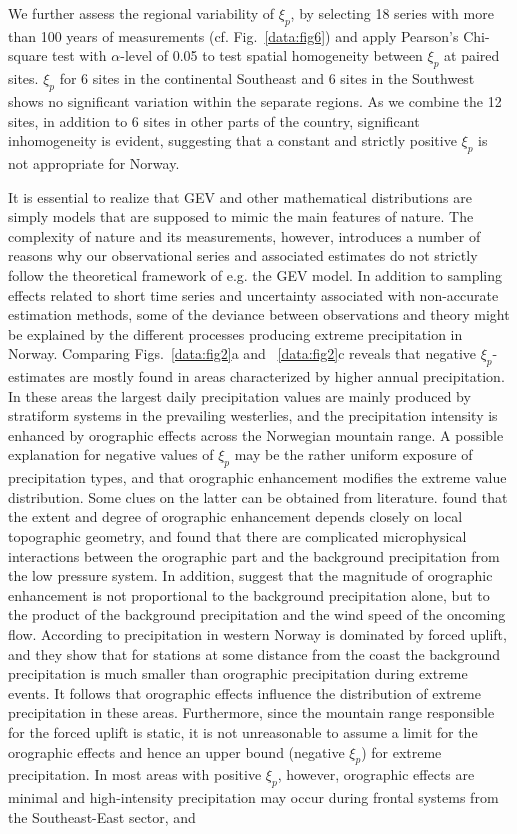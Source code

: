 \documentclass[12pt,a4paper,english]{article}
\begin{document}
We further assess the regional variability of $\xi_{p}$, by selecting 18 series with more than 100 years of measurements (cf. Fig.~\ref{data:fig6}) and apply Pearson's Chi-square test \citep{Pearson1900} with $\alpha$-level of 0.05 to test spatial homogeneity between $\xi_{p}$ at paired sites. $\xi_{p}$ for 6 sites in the continental Southeast and 6 sites in the Southwest shows no significant variation within the separate regions. As we combine the 12 sites, in addition to 6 sites in other parts of the country, significant inhomogeneity is evident, suggesting that a constant and strictly positive $\xi_{p}$ is not appropriate for Norway.

It is essential to realize that GEV and other mathematical distributions are simply models that are supposed to mimic the main features of nature. The complexity of nature and its measurements, however, introduces a number of reasons why our observational series and associated estimates do not strictly follow the theoretical framework of e.g. the GEV model. In addition to sampling effects related to short time series and uncertainty associated with non-accurate estimation methods, some of the deviance between observations and theory might be explained by the different processes producing extreme precipitation in Norway. Comparing Figs.~\ref{data:fig2}a and ~\ref{data:fig2}c reveals that negative $\xi_{p}$-estimates are mostly found in areas characterized by higher annual precipitation. In these areas the largest daily precipitation values are mainly produced by stratiform systems in the prevailing westerlies, and the precipitation intensity is enhanced by orographic effects across the Norwegian mountain range. A possible explanation for negative values of $\xi_{p}$ may be the rather uniform exposure of precipitation types, and that orographic enhancement modifies the extreme value distribution. Some clues on the latter can be obtained from literature. \cite{Blumen1990, YuandCheng2013} found that the extent and degree of orographic enhancement depends closely on local topographic geometry, and \cite{YuandCheng2008, YuandCheng2013} found that there are complicated microphysical interactions between the orographic part and the background precipitation from the low pressure system. In addition, \cite{YuandCheng2013} suggest that the magnitude of orographic enhancement is not proportional to the background precipitation alone, but to the product of the background precipitation and the wind speed of the oncoming flow. According to \cite{CarolettiandBarstad2010} precipitation in western Norway is dominated by forced uplift, and they show that for stations at some distance from the coast the background precipitation is much smaller than orographic precipitation during extreme events. It follows that orographic effects influence the distribution of extreme precipitation in these areas. Furthermore, since the mountain range responsible for the forced uplift is static, it is not unreasonable to assume a limit for the orographic effects and hence an upper bound (negative $\xi_{p}$) for extreme precipitation. In most areas with positive $\xi_{p}$, however, orographic effects are minimal and high-intensity precipitation may occur during frontal systems from the Southeast-East sector, and 
\end{document}
